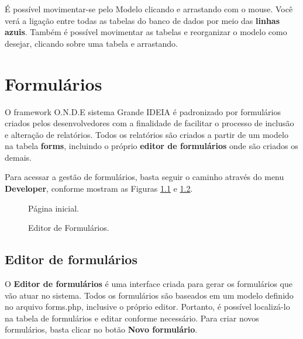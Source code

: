 \documentclass[9pt]{report}
\begin{document}
{      É possível movimentar-se pelo Modelo clicando e arrastando com
      o mouse. Você verá a ligação entre todas as tabelas do banco
      de dados por meio das \textbf{linhas azuis}. Também é possível
      movimentar as tabelas e reorganizar o modelo como desejar,
      clicando sobre uma tabela e arrastando.

   \chapter{Formulários}
   
   O framework O.N.D.E sistema Grande IDEIA é padronizado por
   formulários criados pelos desenvolvedores com a finalidade de
   facilitar o processo de inclusão e alteração de relatórios. Todos
   os relatórios são criados a partir de um modelo na tabela
   \textbf{forms}, incluindo o próprio \textbf{editor de formulários}
   onde são criados os demais.
   
   Para acessar a gestão de formulários, basta seguir o caminho
   através do menu \textbf{Developer}, conforme mostram as Figuras
   \figurename{ \ref{fig:capa}} e \figurename{ \ref{fig:editorf}}.

    \begin{figure}[H]
      \caption{Página inicial.}
      \label{fig:capa}
    \end{figure}

    \begin{figure}[H]
      \caption{Editor de Formulários.}
      \label{fig:editorf}
    \end{figure}

   \section{Editor de formulários}

   O \textbf{Editor de formulários} é uma interface criada para gerar
   os formulários que vão atuar no sistema. Todos os formulários são
   baseados em um modelo definido no arquivo forms.php, inclusive o
   próprio editor. Portanto, é possível localizá-lo na tabela de
   formulários e editar conforme necessário. Para criar novos
   formulários, basta clicar no botão \textbf{Novo formulário}.

}
\end{document}
